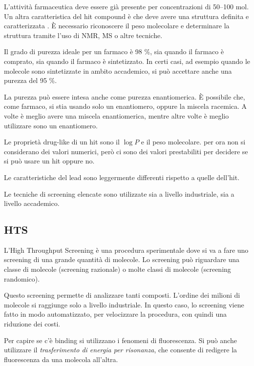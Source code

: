 L'attività farmaceutica deve essere già presente per concentrazioni di
50--100 \mu{}mol. Un altra caratteristica del hit compound è che deve
avere una struttura definita e caratterizzata
.
È necessario riconoscere il peso molecolare e determinare la struttura
tramite l'uso di NMR, MS o altre tecniche.

Il grado di purezza ideale per un farmaco è 98 \%, sia quando il farmaco
è comprato, sia quando il farmaco è sintetizzato. In certi casi, ad
esempio quando le molecole sono sintetizzate in ambito accademico, si
può accettare anche una purezza del 95 \%.

La purezza può essere intesa anche come purezza enantiomerica. È
possibile che, come farmaco, si stia usando solo un enantiomero, oppure
la miscela racemica. A volte è meglio avere una miscela enantiomerica,
mentre altre volte è meglio utilizzare sono un enantiomero.

Le proprietà drug-like di un hit sono il \(\log{} P\) e il peso
molecolare. per ora non si considerano dei valori numerici, però ci sono
dei valori prestabiliti per decidere se si può usare un hit oppure no.

Le caratteristiche del lead sono leggermente differenti rispetto a
quelle dell'hit.

Le tecniche di screening elencate sono utilizzate sia a livello
industriale, sia a livello accademico.

\subsection{HTS}

L'High Throughput Screening è una procedura sperimentale dove si va a
fare uno screening di una grande quantità di molecole. Lo screening può
riguardare una classe di molecole (screening razionale) o molte classi
di molecole (screening randomico).

Questo screening permette di analizzare tanti composti. L'ordine dei
milioni di molecole si raggiunge solo a livello industriale. In questo
caso, lo screening viene fatto in modo automatizzato, per velocizzare la
procedura, con quindi una riduzione dei costi.

Per capire se c'è binding si utilizzano i fenomeni di fluorescenza. Si
può anche utilizzare il \emph{trasferimento di energia per risonanza},
che consente di redigere la fluorescenza da una molecola all'altra.

